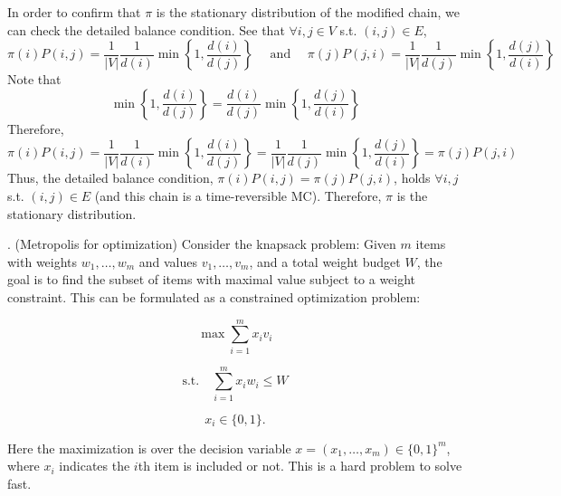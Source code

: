 \documentclass{article}
\begin{document}
{In order to confirm that \(\pi\) is the stationary distribution of the modified chain, we can check the detailed balance condition. See that \(\forall i,j \in V \) s.t. \( (i,j) \in E \),
\[
    \pi(i) P(i,j) = \frac{1}{|V|} \frac{1}{d(i)} \min\left\{ 1, \frac{d(i)}{d(j)} \right\} \quad \text{ and } \quad
\pi(j) P(j,i) = \frac{1}{|V|} \frac{1}{d(j)} \min\left\{ 1, \frac{d(j)}{d(i)} \right\}
\]
Note that
\[
\min\left\{ 1, \frac{d(i)}{d(j)} \right\} = \frac{d(i)}{d(j)} \min\left\{ 1, \frac{d(j)}{d(i)} \right\}
\]
Therefore,
\[
\pi(i) P(i,j) = \frac{1}{|V|} \frac{1}{d(i)} \min\left\{ 1, \frac{d(i)}{d(j)} \right\} 
= \frac{1}{|V|} \frac{1}{d(j)} \min\left\{ 1, \frac{d(j)}{d(i)} \right\} 
= \pi(j) P(j,i)
\]
Thus, the detailed balance condition,
$\pi(i)P(i,j) = \pi(j)P(j,i)$,
holds \(\forall i,j \) s.t. \( (i,j) \in E \) (and this chain is a time-reversible MC). Therefore, \(\pi\) is the stationary distribution.
}

. (Metropolis for optimization) Consider the knapsack problem: Given $m$ items with weights $w_1, \dots, w_m$ and values $v_1, \dots, v_m$, and a total weight budget $W$, the goal is to find the subset of items with maximal value subject to a weight constraint. This can be formulated as a constrained optimization problem:

\[
\max \sum_{i=1}^{m} x_i v_i
\]

\[
\text{s.t.} \quad \sum_{i=1}^{m} x_i w_i \leq W
\]

\[
x_i \in \{0,1\}.
\]

Here the maximization is over the decision variable $x = (x_1, \dots, x_m) \in \{0,1\}^m$, where $x_i$ indicates the $i$th item is included or not. This is a hard problem to solve fast.
\end{document}
